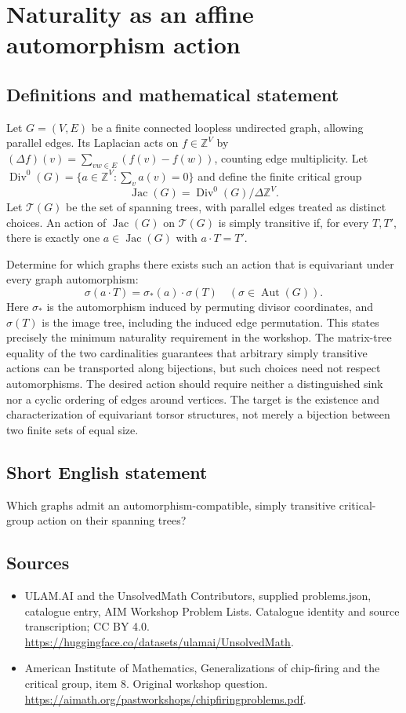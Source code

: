 \documentclass[11pt,a4paper]{article}
\begin{document}
\section*{Naturality as an affine automorphism action}\label{statement}

\subsection{Definitions and mathematical statement}
Let $G=(V,E)$ be a finite connected loopless undirected graph, allowing parallel edges.
Its Laplacian acts on $f\in\mathbb Z^V$ by
$(\Delta f)(v)=\sum_{vw\in E}(f(v)-f(w))$, counting edge multiplicity.
Let $\operatorname{Div}^0(G)=\{a\in\mathbb Z^V:\sum_v a(v)=0\}$ and define the finite critical group
\[
 \operatorname{Jac}(G)=\operatorname{Div}^0(G)/\Delta\mathbb Z^V.
\]
Let $\mathcal T(G)$ be the set of spanning trees, with parallel edges treated as distinct choices.
An action of $\operatorname{Jac}(G)$ on $\mathcal T(G)$ is simply transitive if, for every $T,T'$, there is exactly one $a\in\operatorname{Jac}(G)$ with $a\cdot T=T'$.

Determine for which graphs there exists such an action that is equivariant under every graph automorphism:
\[
 \sigma(a\cdot T)=\sigma_*(a)\cdot\sigma(T)
 \quad(\sigma\in\operatorname{Aut}(G)).
\]
Here $\sigma_*$ is the automorphism induced by permuting divisor coordinates, and $\sigma(T)$ is the image tree, including the induced edge permutation.
This states precisely the minimum naturality requirement in the workshop.
The matrix-tree equality of the two cardinalities guarantees that arbitrary simply transitive actions can be transported along bijections, but such choices need not respect automorphisms.
The desired action should require neither a distinguished sink nor a cyclic ordering of edges around vertices.
The target is the existence and characterization of equivariant torsor structures, not merely a bijection between two finite sets of equal size.
\subsection{Short English statement}
Which graphs admit an automorphism-compatible, simply transitive critical-group action on their spanning trees?
\subsection{Sources}
\begin{itemize}
\item[S1] ULAM.AI and the UnsolvedMath Contributors, supplied problems.json, catalogue entry, AIM Workshop Problem Lists. Catalogue identity and source transcription; CC BY 4.0.
\url{https://huggingface.co/datasets/ulamai/UnsolvedMath}.
\item[S2] American Institute of Mathematics, Generalizations of chip-firing and the critical group, item 8. Original workshop question.
\url{https://aimath.org/pastworkshops/chipfiringproblems.pdf}.
\end{itemize}
\end{document}
